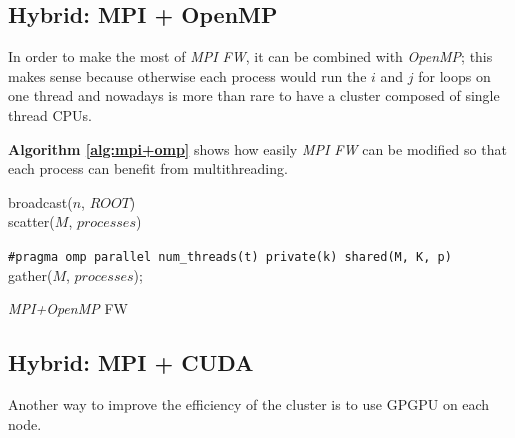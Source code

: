 \subsection{Hybrid: MPI + OpenMP}
In order to make the most of \emph{MPI FW}, it can be combined with \emph{OpenMP}; this
makes sense because otherwise each process would run the $i$ and $j$ for loops on one thread and nowadays
is more than rare to have a cluster composed of single thread CPUs.

\textbf{Algorithm \ref*{alg:mpi+omp}} shows how easily \emph{MPI FW} can be modified
so that each process can benefit from multithreading.
\begin{algorithm}[h!]

\SetAlgoLined

broadcast($n$, $ROOT$) \\
scatter($M$, $processes$)

\texttt{\#pragma omp parallel num\_threads(t) private(k) shared(M, K, p)} \\
gather($M$, $processes$);
 
\caption{\emph{MPI+OpenMP} FW}\label{alg:mpi+omp}
\end{algorithm}












\subsection{Hybrid: MPI + CUDA}
Another way to improve the efficiency of the cluster is to 
use GPGPU on each node.

